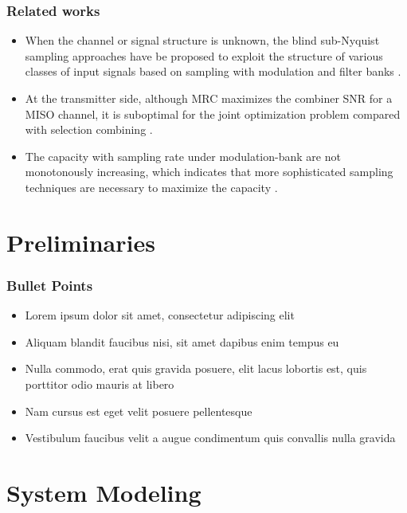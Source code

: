 \documentclass{beamer}
\begin{document}
\begin{frame}
\frametitle{Related works}
\begin{itemize}
  \item When the channel or signal structure is unknown, the blind sub-Nyquist sampling approaches have be proposed to exploit the structure of various classes of input signals based on sampling with modulation and filter banks \cite{Mishali:2010}.
  \item At the transmitter side, although MRC maximizes the combiner SNR for a MISO channel, it is suboptimal for the joint optimization problem compared with selection combining \cite{Goldsmith:2005}.
  \item The capacity with sampling rate under modulation-bank are not monotonously increasing, which indicates that more sophisticated sampling techniques are necessary to maximize the capacity \cite{Chen:20132}.

\end{itemize}
\end{frame}


\section{Preliminaries}

\begin{frame}
\frametitle{Bullet Points}
\begin{itemize}
\item Lorem ipsum dolor sit amet, consectetur adipiscing elit
\item Aliquam blandit faucibus nisi, sit amet dapibus enim tempus eu
\item Nulla commodo, erat quis gravida posuere, elit lacus lobortis est, quis porttitor odio mauris at libero
\item Nam cursus est eget velit posuere pellentesque
\item Vestibulum faucibus velit a augue condimentum quis convallis nulla gravida
\end{itemize}
\end{frame}



\section{System Modeling}
\end{document}
